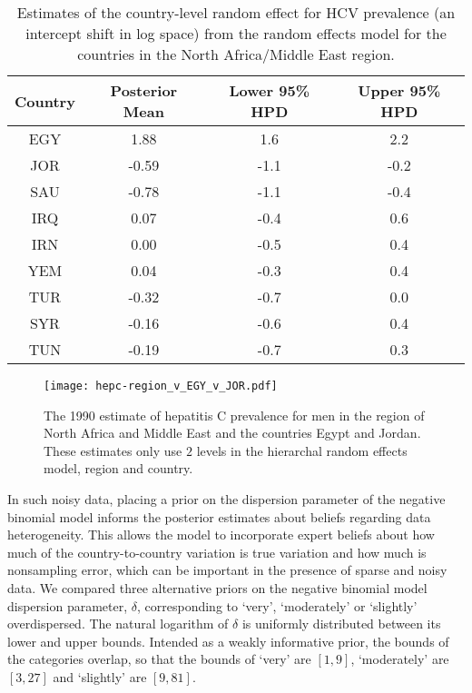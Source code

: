    \begin{table}[h]
        \begin{center}
        \begin{tabular}{|c|c|c|c|}
            \hline
                Country & Posterior Mean & Lower 95\% HPD  & Upper 95\%  HPD \\
            \hline
                EGY	&	1.88	&	 1.6	&	2.2	\\
                JOR	&	-0.59	&	-1.1	&	-0.2 \\
                SAU	&	-0.78	&	-1.1	&	-0.4 \\
                IRQ	&	0.07	&	-0.4	&	0.6	\\
                IRN	&	0.00	&	-0.5	&	0.4	\\
                YEM	&	0.04	&	-0.3	&	0.4	\\
                TUR	&	-0.32	&	-0.7	&	0.0	\\
                SYR	&	-0.16	&	-0.6	&	0.4	\\
                TUN	&	-0.19	&	-0.7	&	0.3	\\
            \hline
        \end{tabular}
        \end{center}
        \caption{ Estimates of the country-level random effect for HCV
          prevalence (an intercept shift in log space) from the random
          effects model for the countries in the North Africa/Middle
          East region.}
        \label{tab:app-hepc regional rfx}
    \end{table}

    \begin{figure}[h]
        \begin{center}
            \texttt{[image: hepc-region\_v\_EGY\_v\_JOR.pdf]}
            \caption{The 1990 estimate of hepatitis C prevalence for
              men in the region of North Africa and Middle East and
              the countries Egypt and Jordan.  These estimates only
              use $2$ levels in the hierarchal random effects
              model, region and country.}
            \label{fig:app-hepc regional rfx}
        \end{center}
    \end{figure}

In such noisy data, placing a prior on the dispersion parameter of the
negative binomial model informs the posterior estimates about beliefs
regarding data heterogeneity.  This allows the model to incorporate
expert beliefs about how much of the country-to-country variation is
true variation and how much is nonsampling error, which can be
important in the presence of sparse and noisy data.  We compared three
alternative priors on the negative binomial model dispersion
parameter, $\delta$, corresponding to `very', `moderately' or
`slightly' overdispersed.  The natural logarithm of $\delta$ is
uniformly distributed between its lower and upper bounds.  Intended as
a weakly informative prior, the bounds of the categories overlap, so
that the bounds of `very' are $[1,9]$, `moderately' are $[3,27]$ and
`slightly' are $[9,81]$.

